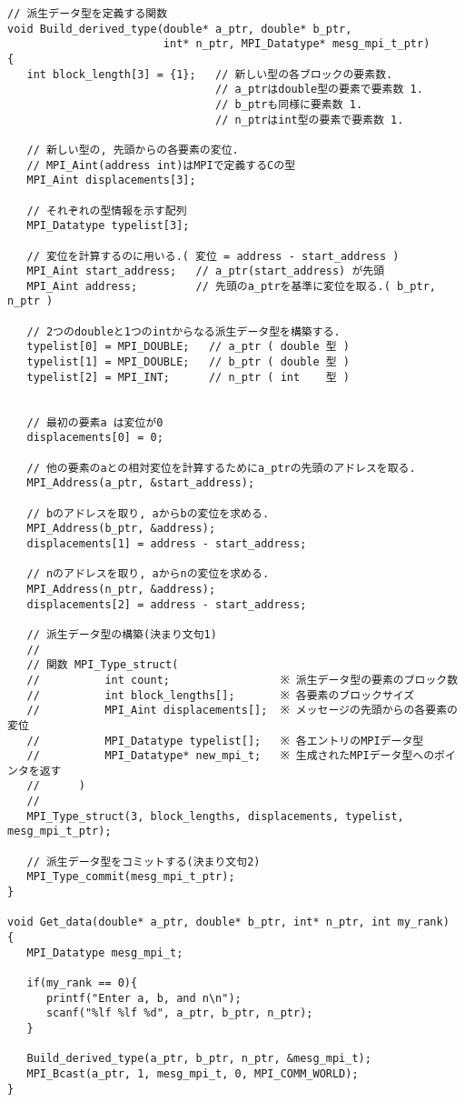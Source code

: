 \documentclass[a4paper,titlepage]{jreport}
\begin{document}
\begin{verbatim}
// 派生データ型を定義する関数
void Build_derived_type(double* a_ptr, double* b_ptr,
                        int* n_ptr, MPI_Datatype* mesg_mpi_t_ptr)
{
   int block_length[3] = {1};   // 新しい型の各ブロックの要素数.
                                // a_ptrはdouble型の要素で要素数 1.
                                // b_ptrも同様に要素数 1.
                                // n_ptrはint型の要素で要素数 1.

   // 新しい型の, 先頭からの各要素の変位.
   // MPI_Aint(address int)はMPIで定義するCの型
   MPI_Aint displacements[3];

   // それぞれの型情報を示す配列
   MPI_Datatype typelist[3];

   // 変位を計算するのに用いる.( 変位 = address - start_address )
   MPI_Aint start_address;   // a_ptr(start_address) が先頭
   MPI_Aint address;         // 先頭のa_ptrを基準に変位を取る.( b_ptr, n_ptr )

   // 2つのdoubleと1つのintからなる派生データ型を構築する.
   typelist[0] = MPI_DOUBLE;   // a_ptr ( double 型 )
   typelist[1] = MPI_DOUBLE;   // b_ptr ( double 型 )
   typelist[2] = MPI_INT;      // n_ptr ( int    型 )


   // 最初の要素a は変位が0
   displacements[0] = 0;
                   
   // 他の要素のaとの相対変位を計算するためにa_ptrの先頭のアドレスを取る.
   MPI_Address(a_ptr, &start_address);

   // bのアドレスを取り, aからbの変位を求める.
   MPI_Address(b_ptr, &address);
   displacements[1] = address - start_address;

   // nのアドレスを取り, aからnの変位を求める.
   MPI_Address(n_ptr, &address);
   displacements[2] = address - start_address;

   // 派生データ型の構築(決まり文句1)
   //
   // 関数 MPI_Type_struct(
   //          int count;                 ※ 派生データ型の要素のブロック数
   //          int block_lengths[];       ※ 各要素のブロックサイズ
   //          MPI_Aint displacements[];  ※ メッセージの先頭からの各要素の変位
   //          MPI_Datatype typelist[];   ※ 各エントリのMPIデータ型
   //          MPI_Datatype* new_mpi_t;   ※ 生成されたMPIデータ型へのポインタを返す
   //      )
   //
   MPI_Type_struct(3, block_lengths, displacements, typelist, mesg_mpi_t_ptr);

   // 派生データ型をコミットする(決まり文句2)
   MPI_Type_commit(mesg_mpi_t_ptr);
}

void Get_data(double* a_ptr, double* b_ptr, int* n_ptr, int my_rank)
{
   MPI_Datatype mesg_mpi_t;

   if(my_rank == 0){
      printf("Enter a, b, and n\n");
      scanf("%lf %lf %d", a_ptr, b_ptr, n_ptr);
   }

   Build_derived_type(a_ptr, b_ptr, n_ptr, &mesg_mpi_t);
   MPI_Bcast(a_ptr, 1, mesg_mpi_t, 0, MPI_COMM_WORLD);
}
\end{verbatim}
\end{document}

